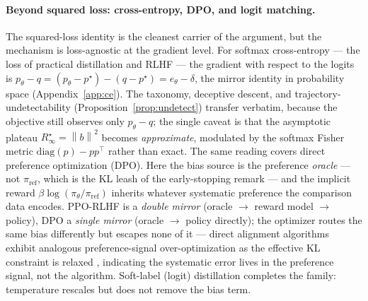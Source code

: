 \documentclass[10pt]{article} %
\theoremstyle{plain}
\theoremstyle{remark}
\newcommand{\norm}[1]{\left\lVert #1 \right\rVert}
\begin{document}
\paragraph{Beyond squared loss: cross-entropy, DPO, and logit matching.} The squared-loss identity is the cleanest carrier of the argument, but the mechanism is loss-agnostic at the gradient level. For softmax cross-entropy --- the loss of practical distillation and RLHF --- the gradient with respect to the logits is $p_\theta - q = (p_\theta - p^\star) - (q - p^\star) = e_\theta - \delta$, the mirror identity in probability space (Appendix~\ref{app:ce}). The taxonomy, deceptive descent, and trajectory-undetectability (Proposition~\ref{prop:undetect}) transfer verbatim, because the objective still observes only $p_\theta - q$; the single caveat is that the asymptotic plateau $R^\star_\infty=\norm{b}^2$ becomes \emph{approximate}, modulated by the softmax Fisher metric $\mathrm{diag}(p)-pp^\top$ rather than exact. The same reading covers direct preference optimization (DPO). Here the bias source is the preference \emph{oracle} --- not $\pi_\mathrm{ref}$, which is the KL leash of the early-stopping remark --- and the implicit reward $\beta\log(\pi_\theta/\pi_\mathrm{ref})$ inherits whatever systematic preference the comparison data encodes. PPO-RLHF is a \emph{double mirror} (oracle $\to$ reward model $\to$ policy), DPO a \emph{single mirror} (oracle $\to$ policy directly); the optimizer routes the same bias differently but escapes none of it --- direct alignment algorithms exhibit analogous preference-signal over-optimization as the effective KL constraint is relaxed \citep{rafailov2024daa}, indicating the systematic error lives in the preference signal, not the algorithm. Soft-label (logit) distillation completes the family: temperature rescales but does not remove the bias term.
\end{document}
